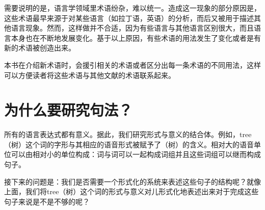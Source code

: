 需要说明的是，语言学领域里术语纷杂，难以统一。造成这一现象的部分原因是，这些术语最早来源于对某些语言（如拉丁语，英语）的分析，而后又被用于描述其他语言现象。然而，这样做并不合适，因为有些语言与其他语言区别很大，而且语言本身也在不断地发展变化。基于以上原因，有些术语的用法发生了变化或者是有新的术语被创造出来。

本书在介绍新术语时，会援引相关的术语或者区分出每一条术语的不同用法，这样可以方便读者将这些术语与其他文献的术语联系起来。


\section{为什么要研究句法？}
\label{sec-wozu-syntax}

所有的语言表达式都有意义。据此，我们研究形式与意义的结合体\citep{Saussure16a}\nocite{Saussure16a-Fr}。例如，tree（树）这个词的字形与其相应的语音形式被赋予了（树）的含义。相对大的语音单位可以由相对小的单位构成：词与词可以一起构成词组并且这些词组可以继而构成句子。

接下来的问题是：我们是否需要一个形式化的系统来表述这些句子的结构呢？就像上面，我们将tree（树）这个词的形式与意义对儿形式化地表述出来对于完成这些句子来说是不是不够的呢？

